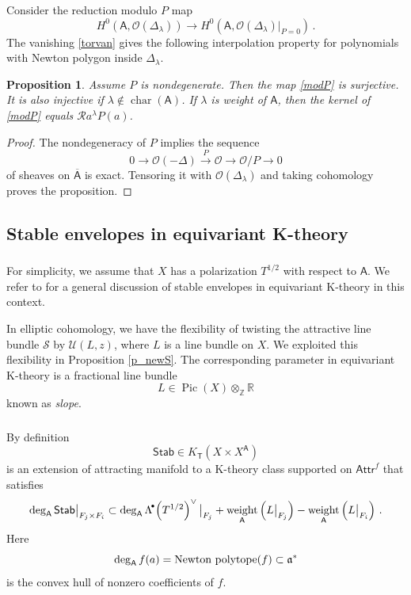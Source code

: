 \documentclass[14pt]{extarticle}
\newcommand{\Z}{\mathbb{Z}}
\newcommand{\R}{\mathbb{R}}
\newcommand{\bT}{\mathsf{T}}
\newcommand{\bA}{\mathsf{A}}
\newcommand{\cR}{\mathscr{R}}
\newcommand{\cU}{\mathscr{U}}
\newcommand{\cS}{\mathscr{S}}
\newcommand{\bbA}{\overline{\bA}}
\newcommand{\cO}{\mathscr{O}}
\newcommand{\fa}{\mathfrak{a}}
\newcommand{\Stab}{\mathsf{Stab}}
\newcommand{\Attr}{\mathsf{Attr}}
\DeclareMathOperator{\cha}{char}
\DeclareMathOperator{\Pic}{Pic}
\DeclareMathOperator{\weight}{weight}
\newcommand{\Ld}{{\Lambda}^{\!\raisebox{0.5mm}{$\scriptscriptstyle
      \bullet$}}\!}
\newtheorem{Proposition}[Lemma]{Proposition}
\theoremstyle{definition}
\begin{document}
 Consider the reduction modulo $P$ map 
 \begin{equation}
   \label{modP}
   H^0(\bA,\cO(\Delta_\lambda)) \to
   H^0(\bA,\cO(\Delta_\lambda)\big|_{P=0}) \,. 
 \end{equation}
 The vanishing \eqref{torvan} gives the following interpolation
 property for polynomials with Newton polygon inside
 $\Delta_\lambda$.

 \begin{Proposition}\label{p_int_toric} 
 Assume $P$ is nondegenerate. Then the map \eqref{modP} is
 surjective. It is also injective if $\lambda \notin \cha(\bA)$. If
 $\lambda$ is weight of $\bA$, then the kernel of \eqref{modP} equals $\cR
 a^\lambda P(a)$. 
\end{Proposition}

\begin{proof}
  The nondegeneracy of $P$ implies the sequence
  $$
  0 \to \cO(-\Delta) \xrightarrow{\, \, P \, \, } \cO \to \cO/P \to 0
  $$
  of sheaves on $\bbA$ is exact. Tensoring it with
  $\cO(\Delta_\lambda)$ and taking cohomology proves the proposition. 
\end{proof}

 \subsection{Stable envelopes in equivariant K-theory}
\label{sec:stable-envel-equiv}

\subsubsection{}
For simplicity, we assume that $X$ has a polarization $T^{1/2}$ with
respect to $\bA$. 
We refer to \cite{Opcmi} for a general discussion of stable envelopes in
equivariant K-theory in this context. 

In elliptic cohomology, we have the flexibility of twisting the
attractive line bundle $\cS$ by $\cU(L,z)$, where $L$ is 
a line bundle on $X$. We exploited this flexibility in Proposition
\ref{p_newS}. The corresponding parameter in equivariant K-theory is
a fractional line bundle
$$
L \in \Pic(X) \otimes_\Z \R
$$
known as \emph{slope}.

\subsubsection{} 


By definition
$$
\Stab \in K_\bT(X \times X^\bA)
$$
is an extension of attracting manifold to a K-theory class
supported on $\Attr^f$ that satisfies
%
\begin{equation}
\deg_\bA \Stab\big|_{F_j \times F_i} \subset
\deg_\bA \Ld  \left(T^{1/2}\right)^\vee \big|_{F_j} +
\weight_\bA\left(L\big|_{F_j}\right) -
\weight_\bA\left(L\big|_{F_i}\right) \,.\label{degStab}
\end{equation}
%
Here
$$
\deg_\bA f(a) = \textup{Newton polytope} (f) \subset \fa^* 
$$
is the convex hull of nonzero coefficients of $f$.
\end{document}
